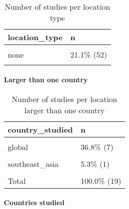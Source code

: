 \documentclass[
]{article}
\begin{document}
\begin{table}[H]

\caption{\label{tab:unnamed-chunk-12}Number of studies per location type}
\centering
\begin{tabular}[t]{ll}
\toprule
location\_type & n\\
\midrule
\cellcolor{gray!6}{real} & \cellcolor{gray!6}{78.9\% (195)}\\
none & 21.1\%  (52)\\
\cellcolor{gray!6}{Total} & \cellcolor{gray!6}{100.0\% (247)}\\
\bottomrule
\end{tabular}
\end{table}

\hypertarget{larger-than-one-country}{%
\paragraph{Larger than one country}\label{larger-than-one-country}}

\begin{table}[H]

\caption{\label{tab:unnamed-chunk-13}Number of studies per location larger than one country}
\centering
\begin{tabular}[t]{ll}
\toprule
country\_studied & n\\
\midrule
\cellcolor{gray!6}{west\_africa} & \cellcolor{gray!6}{47.4\%  (9)}\\
global & 36.8\%  (7)\\
\cellcolor{gray!6}{northern\_hemisphere} & \cellcolor{gray!6}{5.3\%  (1)}\\
southeast\_asia & 5.3\%  (1)\\
\cellcolor{gray!6}{who\_southeast\_asia\_region} & \cellcolor{gray!6}{5.3\%  (1)}\\
\addlinespace
Total & 100.0\% (19)\\
\bottomrule
\end{tabular}
\end{table}

\hypertarget{countries-studied}{%
\paragraph{Countries studied}\label{countries-studied}}
\end{document}
